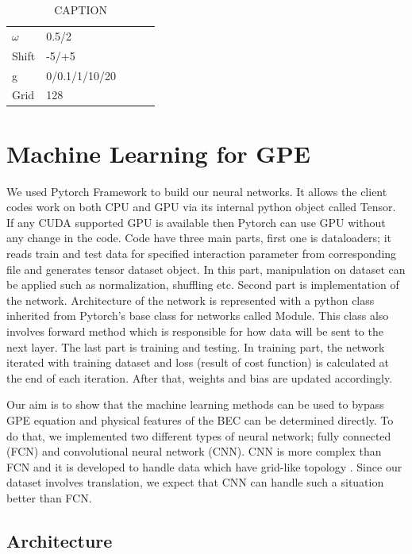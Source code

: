 \documentclass[a4paper,times,12pt]{article}
\begin{document}
\begin{table}[H]
\centering
\caption{CAPTION}
\label{my-label}
\begin{tabular}{lllll}
$\omega$ & 0.5/2         &  &  &  \\
Shift  & -5/+5         &  &  &  \\
g      & 0/0.1/1/10/20 &  &  &  \\
Grid   & 128           &  &  & 
\end{tabular}
\end{table}

\section{Machine Learning for GPE}

We used Pytorch Framework \cite{paszke2017automatic} to build our neural networks. It allows the client codes work on both CPU and GPU via its internal python object called Tensor. If any CUDA supported GPU is available then Pytorch can use GPU without any change in the code. Code have three main parts, first one is dataloaders; it reads train and test data for specified interaction parameter from corresponding file and generates tensor dataset object. In this part, manipulation on dataset can be applied such as normalization, shuffling etc. Second part is implementation of the network. Architecture of the network is represented with a python class inherited from Pytorch's base class for networks called Module. This class also involves forward method which is responsible for how data will be sent to the next layer. The last part is training and testing. In training part, the network iterated with training dataset and loss (result of cost function) is calculated at the end of each iteration. After that, weights and bias are updated accordingly. 

Our aim is to show that the machine learning methods can be used to bypass GPE equation and physical features of the BEC can be determined directly. To do that, we implemented two different types of neural network; fully connected (FCN) and convolutional neural network (CNN). CNN is more complex than FCN and it is developed to handle data which have grid-like topology \cite{goodfellow2016deep}. Since our dataset involves translation, we expect that CNN can handle such a situation better than FCN.


\subsection{Architecture}
\end{document}
